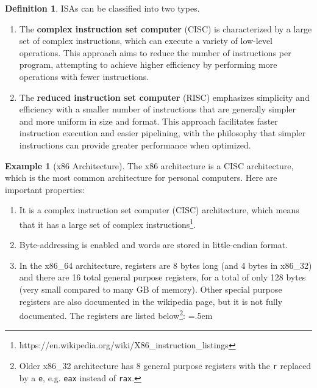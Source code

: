 \documentclass{article}
\theoremstyle{definition}
\newtheorem{example}{Example}[section]
\newtheorem{definition}{Definition}[section]
\newenvironment{cverbatim}
    {\SaveVerbatim{cverb}}
    {\endSaveVerbatim
    \flushleft\fboxrule=0pt\fboxsep=.5em
    \colorbox{cverbbg}{%
      \makebox[\dimexpr\linewidth-2\fboxsep][l]{\BUseVerbatim{cverb}}%
    }
    \endflushleft
  }
\begin{document}
    
    \begin{definition}
      ISAs can be classified into two types. 
      \begin{enumerate} 
        \item The \textbf{complex instruction set computer} (CISC) is characterized by a large set of complex instructions, which can execute a variety of low-level operations. This approach aims to reduce the number of instructions per program, attempting to achieve higher efficiency by performing more operations with fewer instructions.
        \item The \textbf{reduced instruction set computer} (RISC) emphasizes simplicity and efficiency with a smaller number of instructions that are generally simpler and more uniform in size and format. This approach facilitates faster instruction execution and easier pipelining, with the philosophy that simpler instructions can provide greater performance when optimized.
      \end{enumerate}
    \end{definition}

    \begin{example}[x86 Architecture]
      The x86 architecture is a CISC architecture, which is the most common architecture for personal computers. Here are important properties: 
      \begin{enumerate} 
        \item It is a complex instruction set computer (CISC) architecture, which means that it has a large set of complex instructions\footnote{https://en.wikipedia.org/wiki/X86\_instruction\_listings}. 
        \item Byte-addressing is enabled and words are stored in little-endian format.
        \item In the x86\_64 architecture, registers are 8 bytes long (and 4 bytes in x86\_32) and there are 16 total general purpose registers, for a total of only 128 bytes (very small compared to many GB of memory). Other special purpose registers are also documented in the wikipedia page, but it is not fully documented. The registers are listed below\footnote{Older x86\_32 architecture has 8 general purpose registers with the \texttt{r} replaced by a \texttt{e}, e.g. \texttt{eax} instead of \texttt{rax}.}: 
        \begin{cverbatim} 
        \end{cverbatim}
        

      \end{enumerate}

    \end{example}
\end{document}

